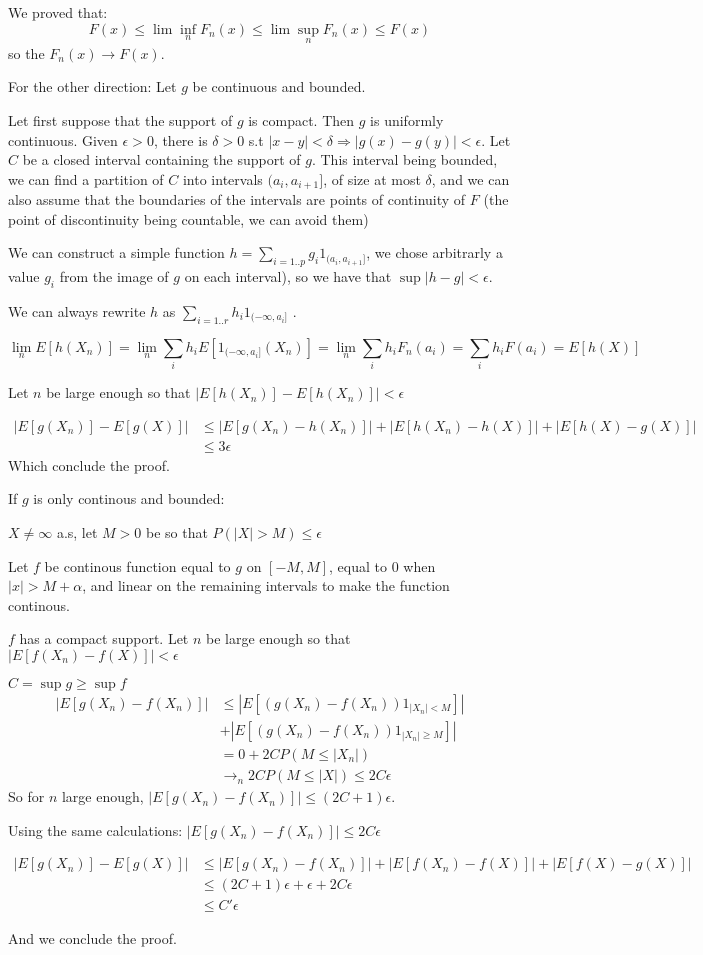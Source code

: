 \documentclass[12pt]{article}
\begin{document}
\begin{enumerate}
We proved that:
$$F(x) \leq \lim \inf_n F_n(x) \leq \lim \sup_n F_n(x) \leq F(x)$$
so the $F_n(x) \rightarrow F(x)$.

For the other direction:
Let $g$ be continuous and bounded.


Let first suppose that the support of $g$ is compact. Then $g$ is uniformly continuous. Given $\epsilon > 0$, there is $\delta > 0$ s.t $|x-y| < \delta \Rightarrow |g(x) - g(y)| < \epsilon$.
Let $C$ be a closed interval containing the support of $g$. This interval being bounded, we can find a partition of $C$ into intervals $(a_i, a_{i+1}]$, of size at most $\delta$, and we can also assume that the boundaries of the intervals are points of continuity of $F$ (the point of discontinuity being countable, we can avoid them)


We can construct a simple function $h = \sum_{i=1..p} g_i 1_{(a_i, a_{i+1}]}$,  we chose arbitrarly a value $g_i$ from the image of $g$ on each interval), so we have that $\sup |h - g| < \epsilon$.

We can always rewrite $h$ as $\sum_{i=1..r} h_i 1_{(-\infty, a_i]}$ .

$$\lim_n E[h(X_n)] = \lim_ n\sum_i h_i E[1_{(-\infty, a_i]}(X_n)] = \lim_n \sum_i h_i F_n(a_i) = \sum_i h_i F(a_i) = E[h(X)]$$

Let $n$ be large enough so that $|E[h(X_n)] - E[h(X_n)]| < \epsilon$

\begin{align}
|E[g(X_n)] - E[g(X)]| &\leq |E[g(X_n) - h(X_n)]| + |E[h(X_n) - h(X)]| + |E[h(X) - g(X)]|
\\&\leq 3\epsilon
\end{align}
Which conclude the proof.


If $g$ is only continous and bounded:

$X \neq \infty$ a.s, let $M > 0$ be so that $P(|X| > M) \leq \epsilon$

Let $f$ be continous function equal to $g$ on $[-M, M]$, equal to 0 when $|x| > M+\alpha$, and linear on the remaining intervals to make the function continous. 

$f$ has a compact support. Let $n$ be large enough so that $|E[f(X_n) - f(X)]| < \epsilon$

$C = \sup g \geq \sup f$
\begin{align}
|E[g(X_n) - f(X_n)]| 
&\leq  |E[(g(X_n) - f(X_n))1_{|X_n| < M}]|
\\&+ |E[(g(X_n) - f(X_n))1_{|X_n| \geq M }]|
\\&= 0 + 2 C P(M \leq |X_n|)
\\&\rightarrow_n 2C  P(M \leq |X|)\leq 2C \epsilon
\end{align}
So for $n$ large enough,  $|E[g(X_n) - f(X_n)]| \leq (2C+1) \epsilon$.


Using the same calculations:
$|E[g(X_n) - f(X_n)]| \leq 2C\epsilon$


\begin{align}
|E[g(X_n)] - E[g(X)]| &\leq |E[g(X_n) - f(X_n)]| + |E[f(X_n) - f(X)]| + |E[f(X) - g(X)]|
\\&\leq (2C+1) \epsilon + \epsilon + 2C \epsilon \\&\leq C' \epsilon
\end{align}

And we conclude the proof.

\end{enumerate}
\end{document}
